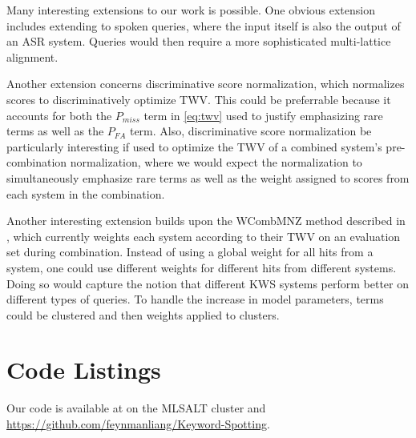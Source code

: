 \documentclass[a4paper,oneside,reqno]{amsart}
\begin{document}
Many interesting extensions to our work is possible. One obvious extension
includes extending to spoken queries, where the input itself is also the
output of an ASR system. Queries would then require a more sophisticated
multi-lattice alignment\cite{lin2008spoken}.

Another extension concerns discriminative score
normalization\cite{xu2014discriminative}, which normalizes scores to
discriminatively optimize TWV. This could be preferrable because it accounts
for both the $P_{miss}$ term in \autoref{eq:twv} used to justify emphasizing
rare terms as well as the $P_{FA}$ term. Also, discriminative score
normalization be particularly interesting if used to optimize the TWV of a
combined system's pre-combination normalization, where we would expect the
normalization to simultaneously emphasize rare terms as well as the weight
assigned to scores from each system in the combination.

Another interesting extension builds upon the WCombMNZ method described in
\cite{mamou2013system}, which currently weights each system according to their
TWV on an evaluation set during combination. Instead of using a global weight
for all hits from a system, one could use different weights for different hits
from different systems. Doing so would capture the notion that different KWS
systems perform better on different types of queries. To handle the increase in
model parameters, terms could be clustered and then weights applied to clusters.


\nocite{*}


\appendix

\section{Code Listings}

Our code is available at  on the MLSALT cluster
and \url{https://github.com/feynmanliang/Keyword-Spotting}.


\end{document}
